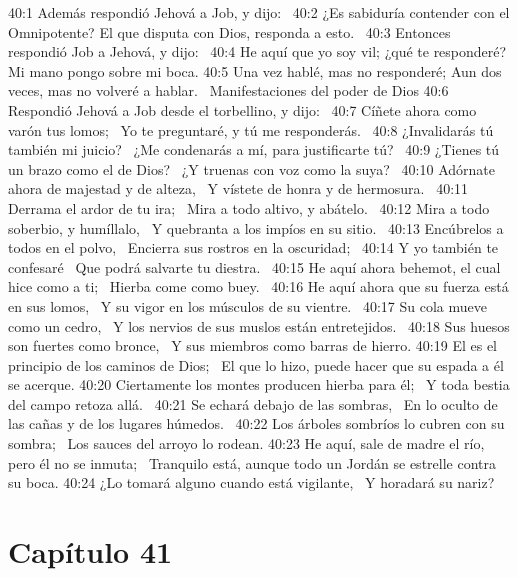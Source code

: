40:1 Además respondió Jehová a Job, y dijo:  
40:2 ¿Es sabiduría contender con el Omnipotente? 
El que disputa con Dios, responda a esto.  
40:3 Entonces respondió Job a Jehová, y dijo:  
40:4 He aquí que yo soy vil; ¿qué te responderé? 
Mi mano pongo sobre mi boca. 
40:5 Una vez hablé, mas no responderé; Aun dos veces, mas no volveré a hablar.  
Manifestaciones del poder de Dios 
40:6 Respondió Jehová a Job desde el torbellino, y dijo:  
40:7 Cíñete ahora como varón tus lomos;  
Yo te preguntaré, y tú me responderás.  
40:8 ¿Invalidarás tú también mi juicio?  
¿Me condenarás a mí, para justificarte tú?  
40:9 ¿Tienes tú un brazo como el de Dios?  
¿Y truenas con voz como la suya?  
40:10 Adórnate ahora de majestad y de alteza,  
Y vístete de honra y de hermosura.  
40:11 Derrama el ardor de tu ira;  
Mira a todo altivo, y abátelo.  
40:12 Mira a todo soberbio, y humíllalo,  
Y quebranta a los impíos en su sitio.  
40:13 Encúbrelos a todos en el polvo,  
Encierra sus rostros en la oscuridad;  
40:14 Y yo también te confesaré  
Que podrá salvarte tu diestra.  
40:15 He aquí ahora behemot, el cual hice como a ti;  
Hierba come como buey.  
40:16 He aquí ahora que su fuerza está en sus lomos,  
Y su vigor en los músculos de su vientre.  
40:17 Su cola mueve como un cedro,  
Y los nervios de sus muslos están entretejidos.  
40:18 Sus huesos son fuertes como bronce,  
Y sus miembros como barras de hierro. 
40:19 El es el principio de los caminos de Dios;  
El que lo hizo, puede hacer que su espada a él se acerque. 
40:20 Ciertamente los montes producen hierba para él;  
Y toda bestia del campo retoza allá.  
40:21 Se echará debajo de las sombras,  
En lo oculto de las cañas y de los lugares húmedos.  
40:22 Los árboles sombríos lo cubren con su sombra;  
Los sauces del arroyo lo rodean. 
40:23 He aquí, sale de madre el río, pero él no se inmuta;  
Tranquilo está, aunque todo un Jordán se estrelle contra su boca. 
40:24 ¿Lo tomará alguno cuando está vigilante,  
Y horadará su nariz?  
\section*{Capítulo 41 }

